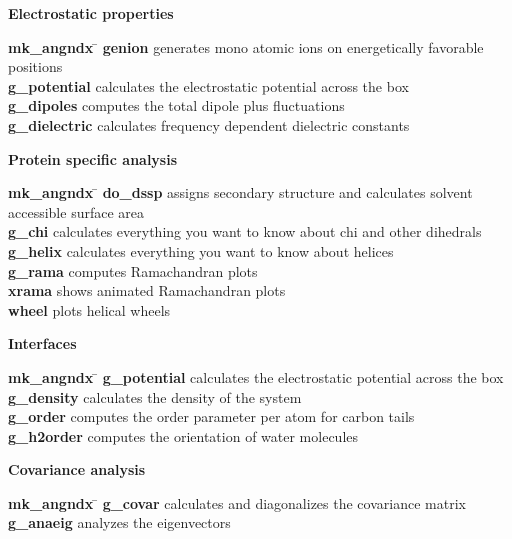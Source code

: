\begin{description}
\item {\large\bf Electrostatic properties}
\begin{tabbing}
{\bf mk\_angndx} \= \kill
{\bf genion} \> generates mono atomic ions on energetically favorable positions \\
{\bf g\_potential} \> calculates the electrostatic potential across the box \\
{\bf g\_dipoles} \> computes the total dipole plus fluctuations \\
{\bf g\_dielectric} \> calculates frequency dependent dielectric constants \\
\end{tabbing}

\item {\large\bf Protein specific analysis}
\begin{tabbing}
{\bf mk\_angndx} \= \kill
{\bf do\_dssp} \> assigns secondary structure and calculates solvent accessible surface area \\
{\bf g\_chi} \> calculates everything you want to know about chi and other dihedrals \\
{\bf g\_helix} \> calculates everything you want to know about helices \\
{\bf g\_rama} \> computes Ramachandran plots \\
{\bf xrama} \> shows animated Ramachandran plots \\
{\bf wheel} \> plots helical wheels \\
\end{tabbing}

\item {\large\bf Interfaces}
\begin{tabbing}
{\bf mk\_angndx} \= \kill
{\bf g\_potential} \> calculates the electrostatic potential across the box \\
{\bf g\_density} \> calculates the density of the system \\
{\bf g\_order} \> computes the order parameter per atom for carbon tails \\
{\bf g\_h2order} \> computes the orientation of water molecules \\
\end{tabbing}

\item {\large\bf Covariance analysis}
\begin{tabbing}
{\bf mk\_angndx} \= \kill
{\bf g\_covar} \> calculates and diagonalizes the covariance matrix \\
{\bf g\_anaeig} \> analyzes the eigenvectors \\
\end{tabbing}


\end{description}
